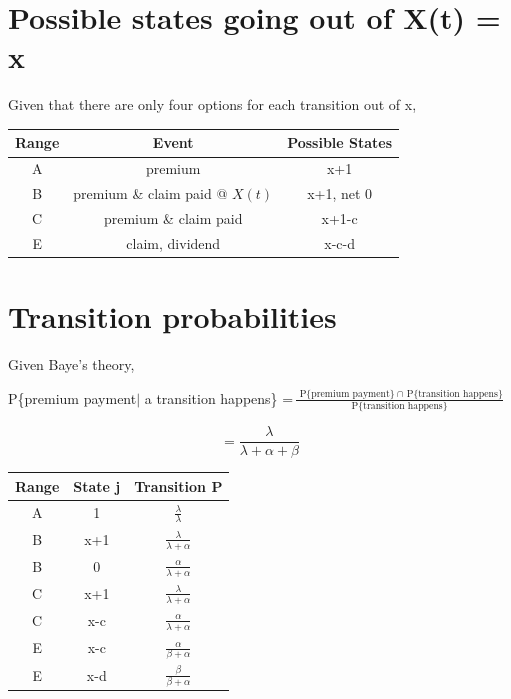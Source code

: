 \documentclass[]{article}
\begin{document}
\section{Possible states going out of X(t) = x}
Given that there are only four options for each transition out of x, 
\begin{center}
	\begin{tabular}{|| c | c | c||} 
		\hline
		Range & Event & Possible States \\ [0.5ex] 
		\hline\hline
		A & premium & x+1 \\ 
		\hline
		B & premium \& claim paid @ $X(t)$& x+1, net 0 \\
		\hline
		C & premium \& claim paid & x+1-c \\
		\hline
		E & claim, dividend & x-c-d\\ [.5ex] 
		\hline
	\end{tabular}
\end{center}

\section{Transition probabilities}
Given Baye's theory, 
\begin{center}
	P\{premium payment$|$ a transition happens\} =$\frac{\text{	P\{premium payment\}}\ \cap \text{ P\{transition happens\}}}{\text{P\{transition happens\}}}$
\end{center}
$$= \frac{\lambda}{\lambda+\alpha+\beta }$$
\begin{center}
	\begin{tabular}{|| c | c | c||} 
		\hline
		Range & State j & Transition P \\ [0.5ex] 
		\hline\hline
		A & 1 & $\frac{\lambda}{\lambda}$ \\ 
		\hline
		B & x+1 & $\frac{\lambda}{\lambda + \alpha}$ \\
		\hline
		B & 0 & $\frac{\alpha}{\lambda + \alpha}$ \\
		\hline
		C & x+1 & $\frac{\lambda}{\lambda + \alpha}$ \\
		\hline
		C & x-c & $\frac{\alpha}{\lambda + \alpha}$ \\
		\hline
		E & x-c & $\frac{\alpha}{\beta + \alpha}$\\ 
		\hline
		E & x-d & $\frac{\beta}{\beta + \alpha}$\\[.5ex] 
		\hline
	\end{tabular}
\end{center}
\end{document}
